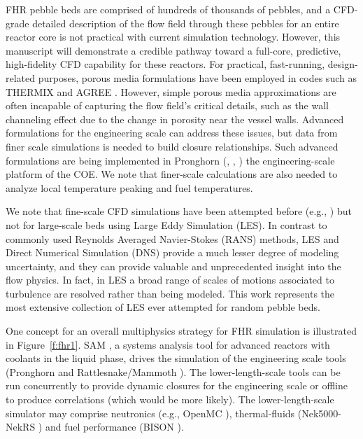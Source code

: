 FHR pebble beds are comprised of hundreds of thousands of pebbles, and a CFD-grade detailed description of the flow field through these pebbles for an entire reactor core is not practical with current simulation technology. However, this manuscript will demonstrate a credible pathway toward a full-core, predictive, high-fidelity CFD capability for these reactors. For practical, fast-running, design-related purposes, porous media formulations have been employed in codes such as THERMIX \cite{cleveland1986application} and AGREE \cite{seker2007multiphysics}. However, simple porous media approximations are often incapable of capturing the flow field's critical details, such as the wall channeling effect due to the change in porosity near the vessel walls.  Advanced formulations for the engineering scale can address these issues, but data from finer scale simulations is needed to build closure relationships. Such advanced formulations are being implemented in  Pronghorn (\cite{novak2018pronghorn}, \cite{novak1}, \cite{novak2}) the engineering-scale platform of the COE. We note that finer-scale calculations are also needed to analyze local temperature peaking and fuel temperatures.

We note that fine-scale CFD simulations have been attempted before (e.g., \cite{vanstaden2018}) but not for large-scale beds using Large Eddy Simulation (LES).  In contrast to commonly used  Reynolds Averaged Navier-Stokes (RANS) methods, LES and Direct Numerical Simulation (DNS) provide a much lesser degree of modeling uncertainty, and they can provide valuable and unprecedented insight into the flow physics. In fact, in LES a broad range of scales of motions associated to turbulence are resolved rather than being modeled. This work represents the most extensive collection of LES ever attempted for random pebble beds.

One concept for an overall multiphysics strategy for FHR simulation is illustrated in Figure~\ref{f:fhr1}. SAM \cite{hu2017sam}, a systems analysis tool for advanced reactors with coolants in the liquid phase, drives the simulation of the engineering scale tools (Pronghorn and Rattlesnake/Mammoth \cite{wang1}). The lower-length-scale tools can be run concurrently to provide dynamic closures for the engineering scale or offline to produce correlations (which would be more likely). The lower-length-scale simulator may comprise neutronics (e.g., OpenMC \cite{romano2013openmc}), thermal-fluids (Nek5000-NekRS \cite{fischer2008}) and fuel performance (BISON \cite{hales2013triso}).

